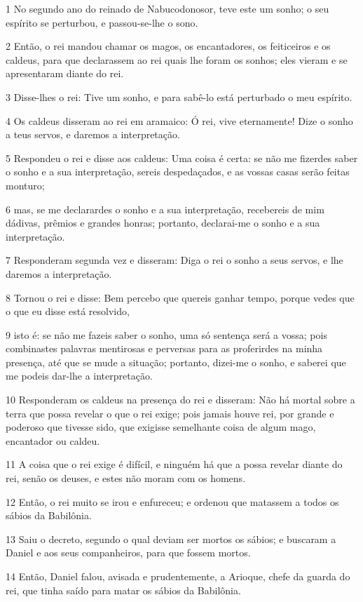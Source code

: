 \par 1 No segundo ano do reinado de Nabucodonosor, teve este um sonho; o seu espírito se perturbou, e passou-se-lhe o sono.
\par 2 Então, o rei mandou chamar os magos, os encantadores, os feiticeiros e os caldeus, para que declarassem ao rei quais lhe foram os sonhos; eles vieram e se apresentaram diante do rei.
\par 3 Disse-lhes o rei: Tive um sonho, e para sabê-lo está perturbado o meu espírito.
\par 4 Os caldeus disseram ao rei em aramaico: Ó rei, vive eternamente! Dize o sonho a teus servos, e daremos a interpretação.
\par 5 Respondeu o rei e disse aos caldeus: Uma coisa é certa: se não me fizerdes saber o sonho e a sua interpretação, sereis despedaçados, e as vossas casas serão feitas monturo;
\par 6 mas, se me declarardes o sonho e a sua interpretação, recebereis de mim dádivas, prêmios e grandes honras; portanto, declarai-me o sonho e a sua interpretação.
\par 7 Responderam segunda vez e disseram: Diga o rei o sonho a seus servos, e lhe daremos a interpretação.
\par 8 Tornou o rei e disse: Bem percebo que quereis ganhar tempo, porque vedes que o que eu disse está resolvido,
\par 9 isto é: se não me fazeis saber o sonho, uma só sentença será a vossa; pois combinastes palavras mentirosas e perversas para as proferirdes na minha presença, até que se mude a situação; portanto, dizei-me o sonho, e saberei que me podeis dar-lhe a interpretação.
\par 10 Responderam os caldeus na presença do rei e disseram: Não há mortal sobre a terra que possa revelar o que o rei exige; pois jamais houve rei, por grande e poderoso que tivesse sido, que exigisse semelhante coisa de algum mago, encantador ou caldeu.
\par 11 A coisa que o rei exige é difícil, e ninguém há que a possa revelar diante do rei, senão os deuses, e estes não moram com os homens.
\par 12 Então, o rei muito se irou e enfureceu; e ordenou que matassem a todos os sábios da Babilônia.
\par 13 Saiu o decreto, segundo o qual deviam ser mortos os sábios; e buscaram a Daniel e aos seus companheiros, para que fossem mortos.
\par 14 Então, Daniel falou, avisada e prudentemente, a Arioque, chefe da guarda do rei, que tinha saído para matar os sábios da Babilônia.
